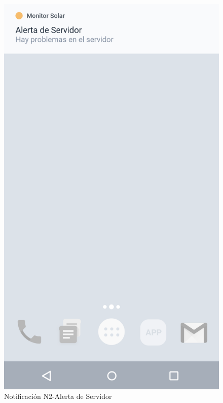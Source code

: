 \begin{figure}[H]
	\centering
	\includegraphics[scale=0.70]{Capitulo4/software/submodulos/images/notif_server.png}
	\caption{Notificación N2-Alerta de Servidor}
	\label{fig:Alerta Servidor}
\end{figure}